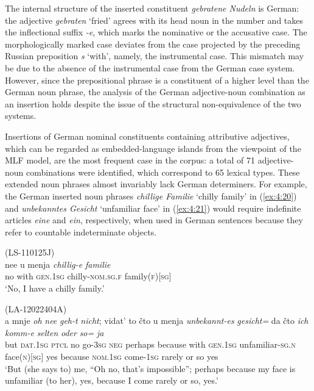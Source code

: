 \z

\noindent The internal structure of the inserted constituent \textit{gebratene Nudeln} is German: the adjective \textit{gebraten} `fried' agrees with its head noun in the number and takes the inflectional suffix \textit{-e}, which marks the nominative or the accusative case. The morphologically marked case deviates from the case projected by the preceding Russian preposition \textit{s} `with', namely, the instrumental case. This mismatch may be due to the absence of the instrumental case from the German case system.  However, since the prepositional phrase is a constituent of a higher level than the German noun phrase, the analysis of the German adjective-noun combination as an insertion holds despite the issue of the structural non-equivalence of the two systems.

Insertions of German nominal constituents containing attributive adjectives, which can be regarded as embedded-language islands from the viewpoint of the MLF model, are the most frequent case in the corpus: a total of 71 adjective-noun combinations were identified, which correspond to 65 lexical types. These extended noun phrases almost invariably lack German determiners. For example, the German inserted noun phrases \textit{chillige Familie} `chilly family' in (\ref{ex:4:20}) and  \textit{unbekanntes Gesicht} `unfamiliar face' in (\ref{ex:4:21}) would require indefinite articles \textit{eine} and \textit{ein}, respectively, when used in German sentences because they refer to countable indeterminate objects.

\ea
\label{ex:4:20}
(LS-110125J)\\
 \gll nee u menja \textit{chillig-e} \textit{familie}\\
 no with \textsc{gen.1sg} chilly-\textsc{nom.sg.f} family(\textsc{f})[\textsc{sg}]\\
\glt `No, I have a chilly family.'
\z

\ea
\label{ex:4:21}
(LA-12022404A)\\
 \gll a mnje \textit{oh} \textit{nee} \textit{geh-t} \textit{nicht}; vidat' {to čto} u menja \textit{unbekannt-es} \textit{gesicht=}  da čto \textit{ich} \textit{komm-e} \textit{selten} \textit{oder} \textit{so=} \textit{ja}\\ 	
 but \textsc{dat.1sg} \textsc{ptcl} no go-\textsc{3sg} \textsc{neg} perhaps because with \textsc{gen.1sg} unfamiliar-\textsc{sg.n} face(\textsc{n})[\textsc{sg}] yes because \textsc{nom.1sg} come-\textsc{1sg} rarely or so yes\\ 
\glt `But (she says to) me, ``Oh no, that's impossible''; perhaps because my face is unfamiliar (to her), yes, because I come rarely or so, yes.'
\z

